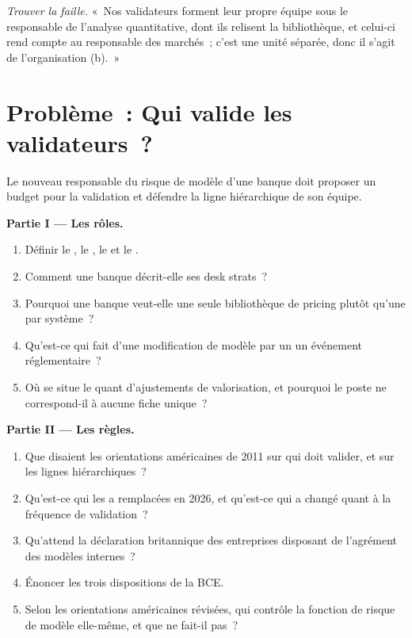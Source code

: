 \begin{exercise}[$\star\star\star$]\label{exo:in:bank-quant:8}
\emph{Trouver la faille.} «~Nos validateurs forment leur propre équipe sous le responsable de l'analyse quantitative, dont ils
relisent la bibliothèque, et celui-ci rend compte au responsable des marchés~; c'est une unité séparée, donc il s'agit de l'organisation (b).~»
\end{exercise}

\section{Problème~: Qui valide les validateurs~?}

\begin{problem}\label{pb:in:bank-quant:1}
Le nouveau responsable du risque de modèle d'une banque doit proposer un budget pour la validation et défendre la ligne hiérarchique de son équipe.

\medskip\noindent\textbf{Partie I --- Les rôles.}
\begin{enumerate}
\item Définir le , le , le  et le .
\item Comment une banque décrit-elle ses desk strats~?
\item Pourquoi une banque veut-elle une seule bibliothèque de pricing plutôt qu'une par système~?
\item Qu'est-ce qui fait d'une modification de modèle par un  un événement réglementaire~?
\item Où se situe le quant d'ajustements de valorisation, et pourquoi le poste ne correspond-il à aucune fiche unique~?
\end{enumerate}

\medskip\noindent\textbf{Partie II --- Les règles.}
\begin{enumerate}[resume]
\item Que disaient les orientations américaines de 2011 sur qui doit valider, et sur les lignes hiérarchiques~?
\item Qu'est-ce qui les a remplacées en 2026, et qu'est-ce qui a changé quant à la fréquence de validation~?
\item Qu'attend la déclaration britannique des entreprises disposant de l'agrément des modèles internes~?
\item Énoncer les trois dispositions de la BCE.
\item Selon les orientations américaines révisées, qui contrôle la fonction de risque de modèle elle-même, et que ne fait-il pas~?
\end{enumerate}


\end{problem}
